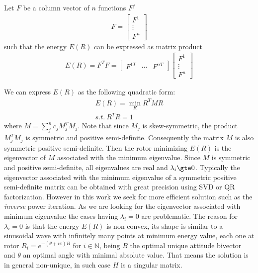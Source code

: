 \documentclass{birkjour}
\numberwithin{equation}{section}
\begin{document}
Let $F$ be a column vector of $n$ functions $F^j$
\begin{eqnarray*}
F = \left[\begin{array}{c}F^1 \\ \vdots \\ F^n\end{array}\right]
\end{eqnarray*}
 such that the energy $E(R)$ can be expressed as matrix product
\begin{eqnarray*}
E(R) = F^T F =
\left[\begin{array}{ccc}F^{1T} & \cdots & F^{nT}\end{array}\right]
\left[\begin{array}{c}F^1 \\ \vdots \\ F^n\end{array}\right]
\end{eqnarray*}

We can express $E(R)$ as the following quadratic form:
\begin{eqnarray*}
E(R) = \min_R R^T M R\\
s.t. \ R^T R = 1
\end{eqnarray*}
where $M = \sum_j^n { c_j M_j^T M_j}$. Note that since $M_j$ is skew-symmetric, the product $M_j^T M_j$ is symmetric and positive semi-definite.
Consequently the matrix $M$ is also symmetric positive semi-definite. Then the rotor minimizing $E(R)$ is the eigenvector of $M$ associated with the minimum eigenvalue.
Since $M$ is symmetric and positive semi-definite, all eigenvalues are real and $\lambda_i \gte 0$.
Typically the eigenvector associated with the minimum eigenvalue of a symmetric positive semi-definite matrix can be obtained with great precision using 
SVD or QR factorization. However in this work we seek for more efficient solution such as the \emph{inverse} power iteration.
As we are looking for the eigenvector associated with minimum eigenvalue the cases having $\lambda_i = 0$ are problematic.
The reason for $\lambda_i = 0$ is that the energy $E(R)$ is non-convex, its shape is similar to a sinusoidal wave with infinitely many points at minimum energy value, 
each one at rotor $R_i = e^{-(\theta + i \pi) B}$ for $i \in \mathbb N$, being $B$ the optimal unique attitude bivector and $\theta $ an optimal angle with minimal absolute value. 
That means the solution is in general non-unique, in such case $H$ is a singular matrix.
\end{document}
